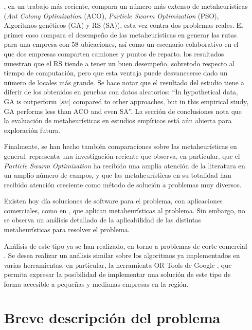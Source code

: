 \documentclass[12pt]{extarticle}
\begin{document}
\cite{asih_comparison_2017}, en un trabajo más reciente, compara un número más
extenso de metaheurísticas (\textit{Ant Colony Optimization} (ACO),
\textit{Particle Swarm Optimization} (PSO), Algoritmos genéticos (GA) y RS
(SA)), esta vez contra dos problemas reales. El primer caso compara el desempeño
de las metaheurísticas en generar las rutas para una empresa con 58 ubicaciones,
así como un escenario colaborativo en el que dos empresas comparten camiones y
puntos de reparto. los resultados muestran que el RS tiende a tener un buen
desempeño, sobretodo respecto al tiempo de computación, pero que esta ventaja
puede desvanecerse dado un número de locales más grande. Se hace notar que el
resultado del estudio tiene a diferir de los obtenidos en pruebas con datos
aleatorios: ``In hypothetical data, GA is outperform [\textit{sic}] compared to
other approaches, but in this empirical study, GA performs less than ACO and
even SA''. La sección de conclusiones nota que la evaluación de metaheurísticas
en estudios empíricos está aún abierta para exploración futura.

Finalmente, se han hecho también comparaciones sobre las metaheurísticas en
general. \cite{hussain_metaheuristic_2019} representa una investigación reciente
que observa, en particular, que el \textit{Particle Swarm Optimization} ha
recibido una amplia atención de la literatura en un amplio número de campos, y
que las metaheurísticas en su totalidad han recibido atención creciente como
método de solución a problemas muy diversos.

Existen hoy día soluciones de software para el problema, con aplicaciones
comerciales, como en \cite{erdogan_open_2017}, que aplican metaheurísticas al
problema. Sin embargo, no se observa un análisis detallado de la aplicabilidad
de las distintas metaheurísticas para resolver el problema.

Análisis de este tipo ya se han realizado, en torno a problemas de corte
comercial \cite{gavalas_survey_2014}. Se desea realizar un análisis similar
sobre los algoritmos ya implementados en varias herramientas, en particular, la
herramienta OR-Tools de Google \cite{noauthor_or-tools_nodate}, que permita
expresar la posibilidad de implementar una solución de este tipo de forma
accesible a pequeñas y medianas empresas en la región.

\section{Breve descripción del problema}
\end{document}
